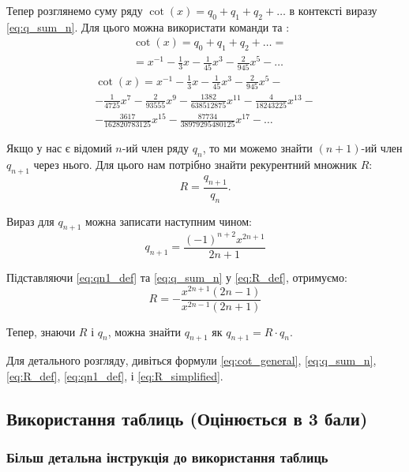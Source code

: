 	Тепер розглянемо суму ряду \( \cot(x)  = q_0 + q_1 + q_2 + \ldots\) в контексті виразу \eqref{eq:q_sum_n}. Для цього можна використати команди  та :
	\begin{align} \label{eq:cot_sum}
		& \cot(x) = q_0 + q_1 + q_2 + \ldots  = \\ 
		&= {x^{-1}} - \frac{1}{3}x - \frac{1}{45}x^3 - \frac{2}{945}x^5 - \ldots \nonumber
	\end{align}
	\begin{multline} \label{eq:sum_series_10_terms}
		\cot(x) ={x^{-1}} - \frac{1}{3}x - \frac{1}{45}x^3 - \frac{2}{945}x^5 -  \\
		- \frac{1}{4725}x^7 - \frac{2}{93555}x^9 - \frac{1382}{638512875}x^{11} - \frac{4}{18243225}x^{13} - \\
	    - \frac{3617}{162820783125}x^{15} - \frac{87734}{38979295480125}x^{17} - \ldots
	\end{multline}
	
	Якщо у нас є відомий \( n \)-ий член ряду \( q_n \), то ми можемо знайти \( (n+1) \)-ий член \( q_{n+1} \) через нього. Для цього нам потрібно знайти рекурентний множник \( R \): 
	\begin{equation} \label{eq:R_def}
		R = \frac{q_{n+1}}{q_n}.
	\end{equation}
	
	Вираз для \( q_{n+1} \) можна записати наступним чином:
	\begin{equation} \label{eq:qn1_def}
		q_{n+1} = \frac{(-1)^{n+2} x^{2n+1}}{2n+1}
	\end{equation}
	
	Підставляючи \eqref{eq:qn1_def} та \eqref{eq:q_sum_n} у \eqref{eq:R_def}, отримуємо:
	\begin{equation} \label{eq:R_simplified}
		R = -\frac{x^{2n+1} (2n-1)}{x^{2n-1} (2n+1)}
	\end{equation}
	
	Тепер, знаючи \( R \) і \( q_n \), можна знайти \( q_{n+1} \) як \( q_{n+1} = R \cdot q_n \).
	
	Для детального розгляду, дивіться формули \eqref{eq:cot_general}, \eqref{eq:q_sum_n}, \eqref{eq:R_def}, \eqref{eq:qn1_def}, і \eqref{eq:R_simplified}.
	
	
	\subsection{Використання таблиць (Оцінюється в 3 бали)}
	
	\subsubsection{Більш детальна інструкція до використання таблиць}
	

